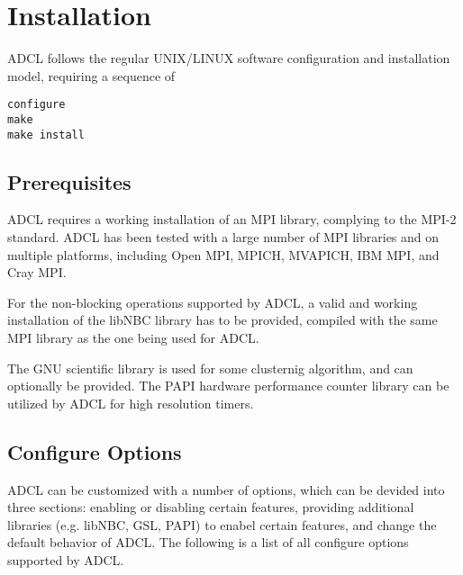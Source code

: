 \section{Installation}

ADCL follows the regular UNIX/LINUX software configuration and installation
model, requiring a sequence of 

\begin{verbatim}
configure
make
make install
\end{verbatim}

\subsection{Prerequisites}

ADCL requires a working installation of an MPI
library, complying to the MPI-2 standard. ADCL has been tested with a large
number of MPI libraries and on multiple platforms, including Open MPI, MPICH,
MVAPICH, IBM MPI, and Cray MPI.

For the non-blocking operations supported by ADCL, a valid and working
installation of the libNBC library has to be provided, compiled with the same
MPI library as the one being used for ADCL.

The GNU scientific library is used for some clusternig algorithm, and can
optionally be provided. The PAPI hardware performance counter library can be
utilized by ADCL for high resolution timers.

\subsection{Configure Options}
ADCL can be customized with a number of options, which can be devided into
three sections: enabling or disabling certain features, providing additional
libraries (e.g. libNBC, GSL, PAPI) to enabel certain features, and change the
default behavior of ADCL. The following is a list of all configure options
supported by ADCL.

